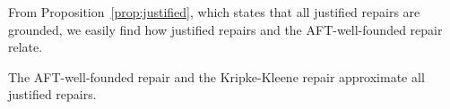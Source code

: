 From Proposition~\ref{prop:justified}, which states that all justified repairs are grounded, we easily find how justified repairs and the AFT-well-founded repair relate. 




\begin{corollary}
 The AFT-well-founded repair and the Kripke-Kleene repair approximate all justified repairs. 
\end{corollary}

